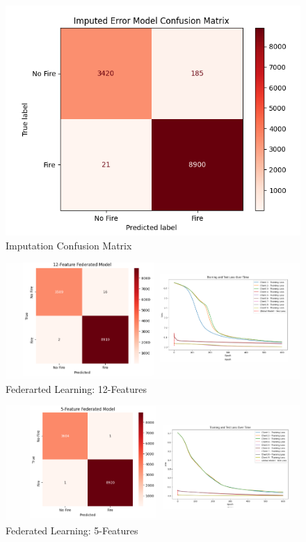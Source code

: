 \documentclass[conference]{IEEEtran}
\begin{document}
\begin{figure}
    \centering
    \includegraphics[width=0.75\linewidth]{images/ImputationCM.png}
    \caption{Imputation Confusion Matrix}
    \label{fig:5.2}
\end{figure}


\begin{figure}
    \centering
    \includegraphics[width=1\linewidth]{images/12Fed.png}
    \caption{Federarted Learning: 12-Features}
    \label{fig:6.0}
\end{figure}

\begin{figure}
    \centering
    \includegraphics[width=1\linewidth]{images/5Fed.png}
    \caption{Federated Learning: 5-Features}
    \label{fig:6.1}
\end{figure}
\end{document}
